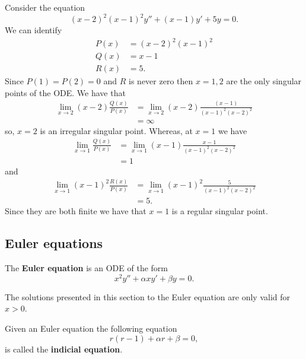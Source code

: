 \documentclass[12pt, a4paper]{article}
\begin{document}
\begin{mdexample}
    Consider the equation 
    \[(x-2)^2(x-1)^2y''+(x-1)y'+5y=0.\]
    We can identify 
    \[\begin{aligned}
        P(x) &= (x-2)^2(x-1)^2 \\
        Q(x) &= x-1 \\
        R(x) &= 5.
    \end{aligned}\]
    Since \(P(1)=P(2)=0\) and \(R\) is never zero then \(x=1,2\) are the only singular points of the ODE. We have that 
    \[\begin{aligned}
        \lim_{x\to 2} (x-2)\frac{Q(x)}{P(x)} &= \lim_{x\to 2} (x-2)\frac{(x-1)}{(x-1)^2(x-2)^2} \\
        &=  \infty
    \end{aligned}\]
    so, \(x=2\) is an irregular singular point. Whereas, at \(x=1\) we have 
    \[\begin{aligned}
        \lim_{x\to 1} \frac{Q(x)}{P(x)} &= \lim_{x\to 1} (x-1)\frac{x-1}{(x-1)^2(x-2)^2} \\
        &= 1
    \end{aligned}\]
    and 
    \[\begin{aligned}
        \lim_{x\to 1} (x-1)^2 \frac{R(x)}{P(x)} &= \lim_{x\to 1} (x-1)^2 \frac{5}{(x-1)^2(x-2)^2} \\
        &=5.
    \end{aligned}\]
    Since they are both finite we have that \(x=1\) is a regular singular point.
\end{mdexample}

\subsection{Euler equations}

\begin{definition}
    The \textbf{Euler equation} is an ODE of the form 
    \[x^2y''+\alpha xy'+\beta y=0.\]
\end{definition}

\begin{mdremark}
    The solutions presented in this section to the Euler equation are only valid for \(x>0\).
\end{mdremark}

\begin{definition}
    Given an Euler equation the following equation 
    \[r(r-1)+\alpha r+\beta=0,\]
    is called the \textbf{indicial equation}.
\end{definition}
\end{document}
